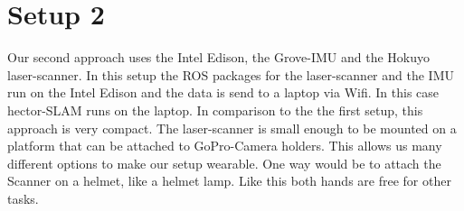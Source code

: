\documentclass{sigchi-ext}
\begin{document}
\section{Setup 2}
Our second approach uses the Intel Edison, the Grove-IMU and the Hokuyo laser-scanner.
In this setup the ROS packages for the laser-scanner and the IMU run on the Intel Edison and the data is send to a laptop via Wifi. In this case hector-SLAM runs on the laptop.
In comparison to the the first setup, this approach is very compact. The laser-scanner is small enough to be mounted on a platform that can be attached to GoPro-Camera holders. This allows us many different options to make our setup wearable. One way would be to attach the Scanner on a helmet, like a helmet lamp. Like this both hands are free for other tasks.



\balance{} 

%
%
\end{document}
